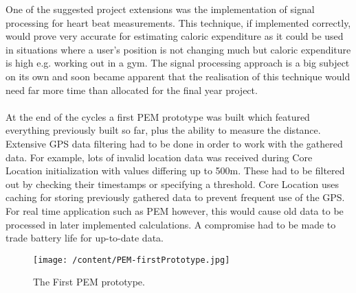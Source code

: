 \documentclass[12pt, a4paper]{report}   %
\begin{document}
\begin{enumerate}
One of the suggested project extensions was the implementation of signal processing for heart beat measurements. This technique, if implemented correctly, would prove very accurate for estimating caloric expenditure as it could be used in situations where a user's position is not changing much but caloric expenditure is high e.g. working out in a gym. The signal processing approach is a big subject on its own and soon became apparent that the realisation of this technique would need far more time than allocated for the final year project.\\ \\
At the end of the cycles a first PEM prototype was built which featured everything previously built so far, plus the ability to measure the distance. Extensive GPS data filtering had to be done in order to work with the gathered data. For example, lots of invalid location data was received during Core Location initialization with values differing up to 500m. These had to be filtered out by checking their timestamps or specifying a threshold. Core Location uses caching for storing previously gathered data to prevent frequent use of the GPS. For real time application such as PEM however, this would cause old data to be processed in later implemented calculations. A compromise had to be made to trade battery life for up-to-date data.


\begin{figure}[H]
  \centering
	\texttt{[image: /content/PEM-firstPrototype.jpg]}
	  \caption{The First PEM prototype.}
\end{figure}


\clearpage

\end{enumerate}
\end{document}
